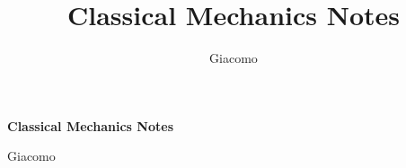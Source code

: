 \documentclass{article}
\title{Classical Mechanics Notes}
\author{Giacomo}
\begin{document}
\begin{titlepage}
    

    \centering
    {\Huge\bfseries Classical Mechanics Notes\par}
    \vspace{1.5cm}
    {\large Giacomo\par}
\end{titlepage}









\end{document}
